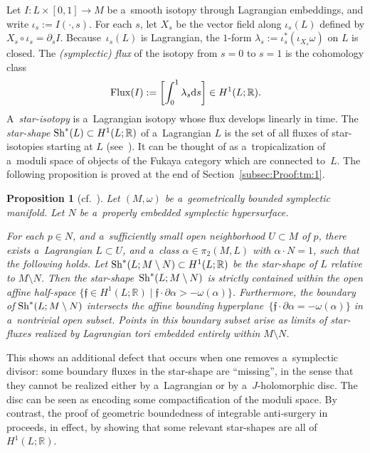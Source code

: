 \documentclass[pdftex]{sigma}
\numberwithin{equation}{section}
\newcommand{\bR}{{\mathbb R}}
\newtheorem{Proposition}[Theorem]{Proposition}
\theoremstyle{definition}
\begin{document}
Let $I\colon L\times[0,1]\to M$ be a~smooth isotopy through Lagrangian embeddings, and write $\iota_s:=I(\cdot,s)$.
For each $s$, let $X_s$ be the vector field along $\iota_s(L)$ defined by $X_s\circ \iota_s=\partial_s I$.
Because~$\iota_s(L)$ is Lagrangian, the $1$-form $\lambda_s:=\iota_s^*(\iota_{X_s}\omega)$ on $L$ is closed.
The \emph{(symplectic) flux} of the isotopy from $s=0$ to $s=1$ is the cohomology class
\[
\mathrm{Flux}(I) := \left[\int_0^1 \lambda_s{\rm d}s\right] \in H^1(L;\bR).
\]
 A~\emph{star-isotopy} is a~Lagrangian isotopy whose flux develops linearly in time. The \emph{star-shape} ${\rm Sh}^*(L) \subset H^1(L; \bR)$ of a~Lagrangian $L$ is the set of all fluxes of star-isotopies starting at $L$ (see~\cite{EntovGanorMembrez,STVFluxShape}). It can be thought of as a~tropicalization of a~moduli space of objects of the Fukaya category which are connected to~$L$.
The following proposition is proved at the end of Section~\ref{subsec:Proof:tm:1}.
\begin{Proposition}[{cf.\ \cite[Theorem~2.2]{STVFluxShape}}]\label{prop:starshape-hypersurface}
Let $(M,\omega)$ be a~geometrically bounded symplectic manifold.
Let $N$ be a~properly embedded symplectic hypersurface.

For each $p\in N$, and a~sufficiently small open neighborhood $U \subset M$ of $p$, there exists a~Lagrangian $L\subset U$, and a~class $\alpha\in\pi_2(M,L)$ with $\alpha\cdot N=1$, such that the following holds.
Let ${\rm Sh}^*(L; M\setminus N)\subset H^1(L;\bR)$ be the star-shape of $L$ relative to $M\setminus N$. Then the star-shape~${{\rm Sh}^*(L; M\setminus N)}$ is strictly contained within the open affine half-space
$
\bigl\{\mathfrak f\in H^1(L;\bR) \mid \mathfrak f\cdot\partial\alpha>-\omega(\alpha)\bigr\}$.
Furthermore, the boundary of ${\rm Sh}^*(L; M\setminus N)$ intersects the affine bounding hyperplane~${\{\mathfrak f\cdot\partial\alpha=-\omega(\alpha)\}}$ in a~nontrivial open subset. Points in this boundary subset arise as limits of star-fluxes realized by Lagrangian tori embedded entirely within $M\setminus N$.

\end{Proposition}
This shows an additional defect that occurs when one removes a~symplectic divisor: some boundary fluxes in the star-shape are ``missing'', in the sense that they cannot be realized either by a~Lagrangian or by a~$J$-holomorphic disc. The disc can be seen as encoding some compactification of the moduli space. By contrast, the proof of geometric boundedness of integrable anti-surgery in~\cite{GromanVarolgunesCompleteEmbeddings} proceeds, in effect, by showing that some relevant star-shapes are all of $H^1(L;\bR)$.
\end{document}
